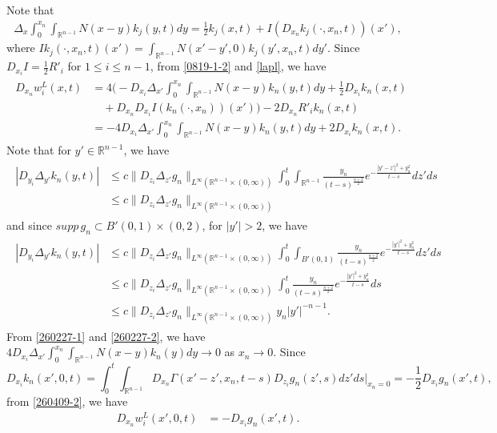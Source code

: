\documentclass{amsart}
\numberwithin{equation}{section}
\newcommand{\Rn}{{\mathbb R}^{n-1}}
\newcommand{\De}{\Delta}
\newcommand{\Ga}{\Gamma}
\begin{document}
Note that 
\begin{align}\label{lapl}
\De_x \int_0^{x_n} \int_{\Rn} N(x-y) k_j (y,t)dy = \frac12 k_j (x,t) + I(D_{x_n} k_j(\cdot, x_n, t))(x'),
\end{align}
where $Ik_j(\cdot, x_n,t)(x') = \int_{\Rn} N(x'-y', 0) k_j (y', x_n,t) dy'$.   Since $D_{x_i} I = \frac12 R'_i$ for $1 \leq i \leq n-1$,  from  \eqref{0819-1-2} and \eqref{lapl}, we have
\begin{align} \label{260409-2}
\begin{split}
 D_{x_n} w^{L}_{i}(x,t) &= 4\Big( - D_{x_i} \De_{x'} \int_0^{x_n} \int_{\Rn} N(x-y)k_n(y,t)dy + \frac12 D_{x_i} k_n(x,t) \\
 & \quad + D_{x_n} D_{x_i} I(k_n(\cdot, x_n))(x') \Big)  - 2 D_{x_n} R'_i k_n(x,t) \\
&= -4 D_{x_i} \De_{x'} \int_0^{x_n} \int_{\Rn} N(x-y)k_n(y,t)dy + 2 D_{x_i} k_n(x,t).
\end{split}
\end{align}
Note that  for $ y'\in \Rn$, we have 
\begin{align}\label{260227-1}
\begin{split}
|D_{y_i} \De_{y'}  k_n(y,t)| %
& \leq c   \|D_{z_i} \De_{z'}   g_n\|_{L^\infty (\Rn \times (0, \infty))} \int_0^t \int_{\Rn}  \frac{y_n}{(t -s)^{\frac{n+2}2}}  e^{-\frac{|y' -z'|^2 + y_n^2}{t -s}}      dz'ds\\
& \leq c   \|D_{z_i} \De_{z'}   g_n\|_{L^\infty (\Rn \times (0, \infty))}
\end{split}
\end{align}
and  since $supp \, g_n \subset B'(0,1) \times (0,2)$, for $|y'|> 2$, we have 
\begin{align}\label{260227-2}
\begin{split}
|D_{y_i} \De_{y'}  k_n(y,t)|  %
& \leq c   \|D_{z_i} \De_{z'}   g_n\|_{L^\infty (\Rn \times (0, \infty))} \int_0^t \int_{B'(0,1)}  \frac{y_n}{(t -s)^{\frac{n+2}2}}  e^{-\frac{|y'|^2 + y_n^2}{t -s}}      dz'ds\\
& \leq c   \|D_{z_i} \De_{z'}   g_n\|_{L^\infty (\Rn \times (0, \infty))} \int_0^t   \frac{y_n}{(t -s)^{\frac{n+2}2}}  e^{-\frac{|y'|^2 + y_n^2 }{t -s}}      ds\\
& \leq c   \|D_{z_i} \De_{z'}   g_n\|_{L^\infty (\Rn \times (0, \infty))}   y_n     |y'|^{-n-1}.
\end{split}
\end{align}
From \eqref{260227-1} and \eqref{260227-2}, we have $4 D_{x_i} \De_{x'} \int_0^{x_n} \int_{\Rn} N(x-y)k_n(y)dy \rightarrow 0$ as $ x_n \rightarrow 0$.  Since 
\[
D_{x_i} k_n(x', 0, t) = \int_0^t \int_{\Rn} D_{x_n} \Ga(x' -z', x_n, t-s) D_{z_i} g_n(z',s) dz'ds \Big|_{x_n =0} = -\frac12 D_{x_i} g_n(x',t),
\]
from \eqref{260409-2}, we have 
\begin{align}\label{w-li}
D_{x_n} w^L_{i}(x',0,t) &= -D_{x_i} g_n(x',t).
\end{align}  
\end{document}
